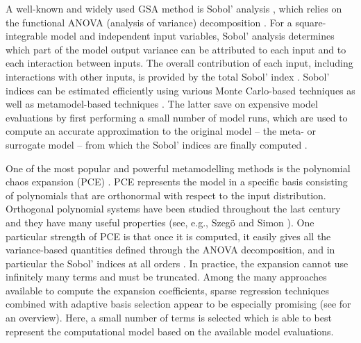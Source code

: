 \documentclass[a4paper,11pt]{article}
\renewcommand{\citep}[2][]{\cite[#1]{#2}}
\renewcommand{\citet}[2][]{\cite[#1]{#2}}
\theoremstyle{definition}
\theoremstyle{remark}
\theoremstyle{theorem}
\begin{document}
A well-known and widely used GSA method is Sobol' analysis \citep{sob93}, which relies on the functional ANOVA (analysis of variance) decomposition \citep{efrste81}. For a square-integrable model and independent input variables, Sobol' analysis determines which part of the model output variance can be attributed to each input and to each interaction between inputs. The overall contribution of each input, including interactions with other inputs, is provided by the total Sobol' index \citep{homsal96}. 
Sobol' indices can be estimated efficiently using various Monte Carlo-based techniques as well as metamodel-based techniques \citep{pritar17}. The latter save on expensive model evaluations by first performing a small number of model runs, which are
used to compute an accurate approximation to the original model -- the meta- or surrogate model -- {from which the Sobol' indices are finally computed} \citep{fanli06,LeGratiet2017}.


One of the most popular and powerful metamodelling methods is the polynomial chaos expansion (PCE) \citep{Xiu2002}. 
PCE represents the model in a specific basis consisting of polynomials that are orthonormal with respect to the input distribution. 
Orthogonal polynomial systems have been studied throughout the last century and they have many useful properties (see, e.g., Szeg\"o \citet{Szeg1939} and Simon \citet{Sim2010}).
One particular strength of PCE is that once it is computed, it easily gives all the variance-based quantities defined through the ANOVA decomposition, and in particular the Sobol' indices at all orders \citep{sud08}. 
In practice, the expansion cannot use infinitely many terms and must be truncated. 
Among the many approaches available to compute the expansion coefficients, sparse regression techniques combined with adaptive basis selection appear to be especially promising (see \cite{LuethenSIAMJUQ2020, LuethenIJUQ2022} for an overview). Here, a small number of terms is selected which is able to best represent the computational model based on the available model evaluations.
\end{document}
